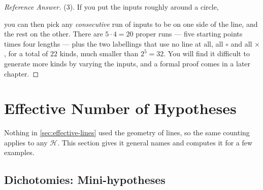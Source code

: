 \begin{proof}[Reference Answer]
    (3). If you put the inputs roughly around a circle,

    \begin{center}
    \end{center}

    you can then pick any \emph{consecutive} run of inputs to be on one side of
    the line, and the rest on the other. There are \(5 \cdot 4 = 20\) proper
    runs --- five starting points times four lengths --- plus the two labellings
    that use no line at all, all \(\circ\) and all \(\times\), for a total of
    \(22\) kinds, much smaller than \(2^5 = 32\). You will find it difficult to
    generate more kinds by varying the inputs, and a formal proof comes in a
    later chapter.
\end{proof}

\section{Effective Number of Hypotheses}\label{sec:effective-hyp}


Nothing in \autoref{sec:effective-lines} used the geometry of lines, so the
same counting applies to any \(\mathcal{H}\). This section gives it general
names and computes it for a few examples.

\subsection{Dichotomies: Mini-hypotheses}

